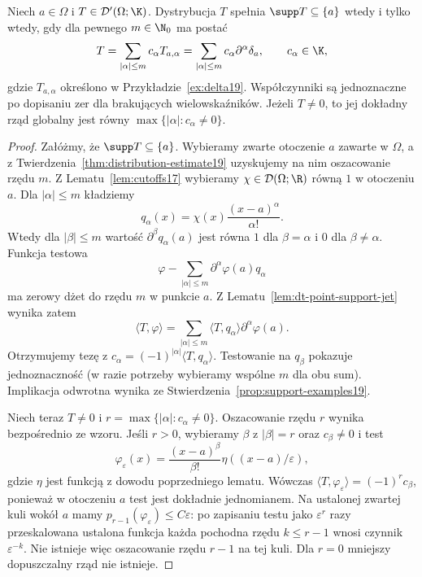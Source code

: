 \begin{twierdzenie}
\label{thm:dt-point-support-structure}
Niech $a\in\Omega$ i $T\in\mathcal D'(\Omega;\K)$.
Dystrybucja $T$ spełnia
$\supp T\subseteq\{a\}$ wtedy i tylko wtedy, gdy
dla pewnego $m\in\N_0$ ma postać
\[
 T=\sum_{|\alpha|\le m}c_\alpha T_{a,\alpha}
   =\sum_{|\alpha|\le m}c_\alpha\partial^\alpha\delta_a,
 \qquad c_\alpha\in\K,
\]
gdzie $T_{a,\alpha}$ określono w Przykładzie~\ref{ex:delta19}.
Współczynniki są jednoznaczne po dopisaniu zer dla
brakujących wielowskaźników.
Jeżeli $T\ne0$, to jej dokładny rząd globalny jest równy
$\max\{|\alpha|:c_\alpha\ne0\}$.
\end{twierdzenie}
\begin{proof}
Załóżmy, że $\supp T\subseteq\{a\}$.
Wybieramy zwarte otoczenie $a$ zawarte w $\Omega$,
a z Twierdzenia~\ref{thm:distribution-estimate19}
uzyskujemy na nim oszacowanie rzędu $m$.
Z Lematu~\ref{lem:cutoffs17} wybieramy
$\chi\in\mathcal D(\Omega;\R)$ równą $1$
w otoczeniu $a$. Dla $|\alpha|\le m$ kładziemy
\[
 q_\alpha(x)=\chi(x)\frac{(x-a)^\alpha}{\alpha!}.
\]
Wtedy dla $|\beta|\le m$ wartość
$\partial^\beta q_\alpha(a)$ jest równa $1$ dla
$\beta=\alpha$ i $0$ dla $\beta\ne\alpha$.
Funkcja testowa
\[
 \varphi-\sum_{|\alpha|\le m}\partial^\alpha\varphi(a)q_\alpha
\]
ma zerowy dżet do rzędu $m$ w punkcie $a$.
Z Lematu~\ref{lem:dt-point-support-jet} wynika zatem
\[
 \langle T,\varphi\rangle
 =\sum_{|\alpha|\le m}\langle T,q_\alpha\rangle
                       \partial^\alpha\varphi(a).
\]
Otrzymujemy tezę z
$c_\alpha=(-1)^{|\alpha|}\langle T,q_\alpha\rangle$.
Testowanie na $q_\beta$ pokazuje jednoznaczność
(w razie potrzeby wybieramy wspólne $m$ dla obu sum).
Implikacja odwrotna wynika ze
Stwierdzenia~\ref{prop:support-examples19}.

Niech teraz $T\ne0$ i $r=\max\{|\alpha|:c_\alpha\ne0\}$.
Oszacowanie rzędu $r$ wynika bezpośrednio ze wzoru.
Jeśli $r>0$, wybieramy $\beta$ z $|\beta|=r$
oraz $c_\beta\ne0$ i test
\[
 \varphi_\varepsilon(x)=
 \frac{(x-a)^\beta}{\beta!}\eta((x-a)/\varepsilon),
\]
gdzie $\eta$ jest funkcją z dowodu poprzedniego lematu.
Wówczas $\langle T,\varphi_\varepsilon\rangle
=(-1)^r c_\beta$, ponieważ w otoczeniu $a$ test jest
dokładnie jednomianem. Na ustalonej zwartej kuli wokół $a$
mamy $p_{r-1}(\varphi_\varepsilon)\le C\varepsilon$:
po zapisaniu testu jako $\varepsilon^r$ razy
przeskalowana ustalona funkcja każda pochodna rzędu
$k\le r-1$ wnosi czynnik $\varepsilon^{-k}$.
Nie istnieje więc oszacowanie rzędu $r-1$ na tej kuli.
Dla $r=0$ mniejszy dopuszczalny rząd nie istnieje.
\end{proof}
